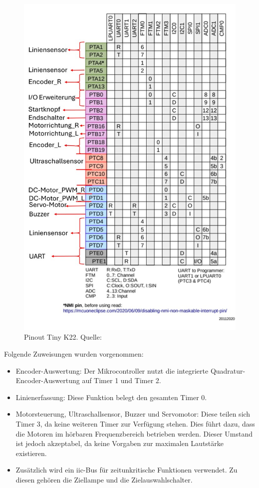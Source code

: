 \begin{figure}[H]
    \centering
    \includegraphics[width=0.8\linewidth, angle=-90]{img/Tiny_K22_Pinout_definition.jpg}
    \caption{Pinout Tiny K22. Quelle: \cite{tiny-K22-Pinout}}
    \label{fig:Tiny_K22_Pinout_definition}
\end{figure}

Folgende Zuweisungen wurden vorgenommen:
\begin{itemize}
    \item Encoder-Auswertung: Der Mikrocontroller nutzt die integrierte Quadratur-Encoder-Auswertung auf Timer 1 und Timer 2.
    \item Linienerfassung: Diese Funktion belegt den gesamten Timer 0.
    \item Motorsteuerung, Ultraschallsensor, Buzzer und Servomotor: Diese teilen sich Timer 3, da keine weiteren Timer zur Verfügung stehen. Dies führt dazu, dass die Motoren im hörbaren Frequenzbereich betrieben werden. Dieser Umstand ist jedoch akzeptabel, da keine Vorgaben zur maximalen Lautstärke existieren.
    \item Zusätzlich wird ein \acrshort{iic}-Bus für zeitunkritische Funktionen verwendet. Zu diesen gehören die Ziellampe und die Zielauswahlschalter.
\end{itemize}

